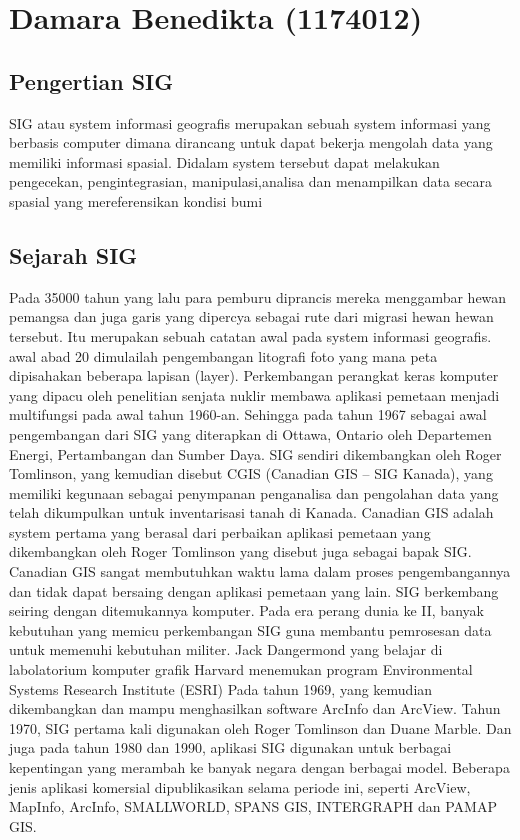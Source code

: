 \section{Damara Benedikta (1174012)}
\subsection{Pengertian SIG}
SIG atau system informasi geografis merupakan sebuah system informasi yang berbasis computer dimana dirancang untuk dapat bekerja mengolah data yang memiliki informasi spasial. Didalam system tersebut dapat melakukan pengecekan, pengintegrasian, manipulasi,analisa dan menampilkan data secara spasial yang mereferensikan kondisi bumi

\subsection{Sejarah SIG}
Pada 35000 tahun yang lalu para pemburu diprancis mereka menggambar hewan pemangsa dan juga garis yang dipercya sebagai rute dari migrasi hewan hewan tersebut. Itu merupakan sebuah catatan awal pada system informasi geografis. 
awal abad 20 dimulailah pengembangan litografi foto yang mana peta dipisahakan beberapa lapisan (layer). Perkembangan perangkat keras komputer yang dipacu oleh penelitian senjata nuklir membawa aplikasi pemetaan menjadi multifungsi pada awal tahun 1960-an.
Sehingga pada tahun 1967 sebagai awal pengembangan  dari SIG yang  diterapkan di Ottawa, Ontario oleh Departemen Energi, Pertambangan dan Sumber Daya. SIG sendiri dikembangkan oleh Roger Tomlinson, yang kemudian disebut CGIS (Canadian GIS – SIG Kanada), yang memiliki kegunaan sebagai penympanan penganalisa dan pengolahan data yang telah dikumpulkan untuk inventarisasi tanah di Kanada.
Canadian GIS adalah system pertama yang berasal dari perbaikan aplikasi pemetaan yang dikembangkan oleh Roger Tomlinson yang disebut juga sebagai bapak SIG. Canadian GIS  sangat membutuhkan waktu lama dalam proses pengembangannya dan tidak dapat bersaing dengan aplikasi pemetaan yang lain. 
SIG berkembang seiring dengan ditemukannya komputer. Pada era perang dunia ke II, banyak kebutuhan  yang memicu perkembangan SIG guna membantu pemrosesan data untuk memenuhi kebutuhan militer.
Jack Dangermond yang belajar di labolatorium komputer grafik Harvard menemukan program Environmental Systems Research Institute (ESRI) Pada tahun 1969,  yang kemudian dikembangkan dan mampu menghasilkan software ArcInfo dan ArcView. Tahun 1970, SIG pertama kali digunakan oleh Roger Tomlinson dan Duane Marble. Dan juga pada tahun  1980 dan 1990, aplikasi SIG digunakan untuk berbagai kepentingan yang merambah ke banyak negara dengan berbagai model. Beberapa jenis aplikasi komersial dipublikasikan selama periode ini, seperti ArcView, MapInfo, ArcInfo, SMALLWORLD, SPANS GIS, INTERGRAPH dan PAMAP GIS.

